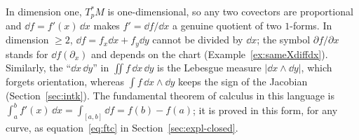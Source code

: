 \begin{specialcase}
In dimension one, $T^*_pM$ is one-dimensional, so any two covectors are proportional and $\dd f=f'(x)\,\dd x$ makes $f'=\dd f/\dd x$ a genuine quotient of two $1$-forms.
In dimension $\ge2$, $\dd f=f_x\dd x+f_y\dd y$ cannot be divided by $\dd x$; the symbol $\partial f/\partial x$ stands for $\dd f(\partial_x)$ and depends on the chart (Example~\ref{ex:sameXdiffdx}).
Similarly, the ``$\dd x\,\dd y$'' in $\iint f\,\dd x\,\dd y$ is the Lebesgue measure $|\dd x\wedge\dd y|$, which forgets orientation, whereas $\int f\,\dd x\wedge\dd y$ keeps the sign of the Jacobian (Section~\ref{sec:intk}).
The fundamental theorem of calculus in this language is $\int_a^bf'(x)\,\dd x=\int_{[a,b]}\dd f=f(b)-f(a)$; it is proved in this form, for any curve, as
equation~\eqref{eq:ftc} in Section~\ref{sec:expl-closed}.
\end{specialcase}
